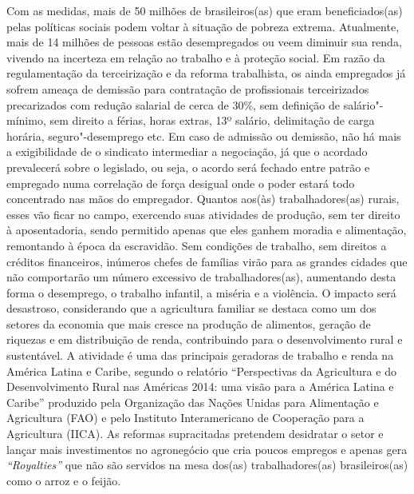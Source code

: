 Com as medidas, mais de 50 milhões de brasileiros(as) que eram
beneficiados(as) pelas políticas sociais podem voltar à situação de
pobreza extrema. Atualmente, mais de 14 milhões de pessoas estão
desempregados ou veem diminuir sua renda, vivendo na incerteza em
relação ao trabalho e à proteção social. Em razão da regulamentação da
terceirização e da reforma trabalhista, os ainda empregados já sofrem
ameaça de demissão para contratação de profissionais terceirizados
precarizados com redução salarial de cerca de 30\%, sem definição de
salário"-mínimo, sem direito a férias, horas extras, 13º salário,
delimitação de carga horária, seguro"-desemprego etc. Em caso de admissão
ou demissão, não há mais a exigibilidade de o sindicato intermediar a
negociação, já que o acordado prevalecerá sobre o legislado, ou seja, o
acordo será fechado entre patrão e empregado numa correlação de força
desigual onde o poder estará todo concentrado nas mãos do empregador.
Quantos aos(às) trabalhadores(as) rurais, esses vão ficar no campo,
exercendo suas atividades de produção, sem ter direito à aposentadoria,
sendo permitido apenas que eles ganhem moradia e alimentação, remontando
à época da escravidão. Sem condições de trabalho, sem direitos a
créditos financeiros, inúmeros chefes de famílias virão para as grandes
cidades que não comportarão um número excessivo de trabalhadores(as),
aumentando desta forma o desemprego, o trabalho infantil, a miséria e a
violência. O impacto será desastroso, considerando que a agricultura
familiar se destaca como um dos setores da economia que mais cresce na
produção de alimentos, geração de riquezas e em distribuição de renda,
contribuindo para o desenvolvimento rural e sustentável. A atividade é
uma das principais geradoras de trabalho e renda na América Latina e
Caribe, segundo o relatório ``Perspectivas da Agricultura e do
Desenvolvimento Rural nas Américas 2014: uma visão para a América Latina
e Caribe'' produzido pela Organização das Nações Unidas para Alimentação
e Agricultura (FAO) e pelo Instituto Interamericano de Cooperação para a
Agricultura (IICA). As reformas supracitadas pretendem desidratar o
setor e lançar mais investimentos no agronegócio que cria poucos
empregos e apenas gera \emph{``Royalties''} que não são servidos na mesa
dos(as) trabalhadores(as) brasileiros(as) como o arroz e o feijão.

